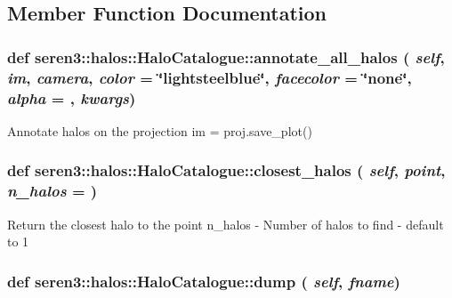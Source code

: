 \subsection{Member Function Documentation}
\hypertarget{classseren3_1_1halos_1_1HaloCatalogue_abe8781bf9bc33c710c00c5f019e0bf0d}{
\subsubsection[{annotate\_\-all\_\-halos}]{\setlength{\rightskip}{0pt plus 5cm}def seren3::halos::HaloCatalogue::annotate\_\-all\_\-halos ( {\em self}, \/   {\em im}, \/   {\em camera}, \/   {\em color} = {\ttfamily \char`\"{}lightsteelblue\char`\"{}}, \/   {\em facecolor} = {\ttfamily \char`\"{}none\char`\"{}}, \/   {\em alpha} = {}, \/   {\em kwargs})}}
\label{classseren3_1_1halos_1_1HaloCatalogue_abe8781bf9bc33c710c00c5f019e0bf0d}
\begin{DoxyVerb}
Annotate halos on the projection
im = proj.save_plot()
\end{DoxyVerb}
 \hypertarget{classseren3_1_1halos_1_1HaloCatalogue_ad902bff6bae6e75cd66a41ad14f25844}{
\subsubsection[{closest\_\-halos}]{\setlength{\rightskip}{0pt plus 5cm}def seren3::halos::HaloCatalogue::closest\_\-halos ( {\em self}, \/   {\em point}, \/   {\em n\_\-halos} = {})}}
\label{classseren3_1_1halos_1_1HaloCatalogue_ad902bff6bae6e75cd66a41ad14f25844}
\begin{DoxyVerb}
Return the closest halo to the point
n_halos - Number of halos to find - default to 1
\end{DoxyVerb}
 \hypertarget{classseren3_1_1halos_1_1HaloCatalogue_a29ba93e6d4e6d58c9f41e188859afed0}{
\subsubsection[{dump}]{\setlength{\rightskip}{0pt plus 5cm}def seren3::halos::HaloCatalogue::dump ( {\em self}, \/   {\em fname})}}
